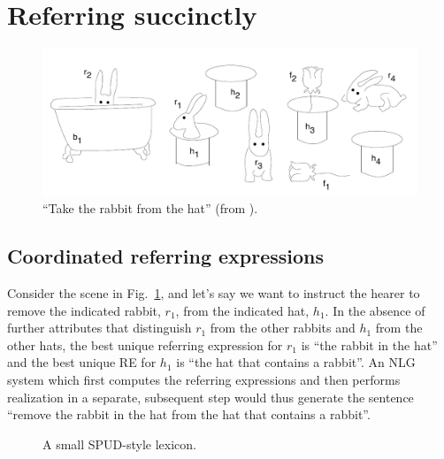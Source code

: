 \section{Referring succinctly}
\label{sec:problem}

\begin{figure}
  \centering
  \includegraphics[width=\columnwidth]{pic-rabbits}
  \caption{``Take the rabbit from the hat'' (from \cite{Stone1998a}).}
  \label{fig:rabbits}
\end{figure}


\subsection{Coordinated referring expressions}

Consider the scene in Fig.~\ref{fig:rabbits}, and let's say we want to
instruct the hearer to remove the indicated rabbit, $r_1$, from the
indicated hat, $h_1$.  In the absence of further attributes that
distinguish $r_1$ from the other rabbits and $h_1$ from the other
hats, the best unique referring expression for $r_1$ is ``the rabbit
in the hat'' and the best unique RE for $h_1$ is ``the hat that
contains a rabbit''.  An NLG system which first computes the referring
expressions and then performs realization in a separate, subsequent
step would thus generate the sentence ``remove the rabbit in the hat
from the hat that contains a rabbit''.

\begin{figure}
  \centering
  
  \caption{A small SPUD-style lexicon.}
  \label{fig:spud-lexicon}
\end{figure}

